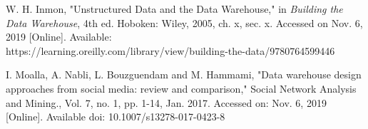 \documentclass[journal]{IEEEtran}
\begin{document}
\ifCLASSOPTIONcaptionsoff
  \newpage
\fi

\begin{thebibliography}{1}

W. H. Inmon, "Unstructured Data and the Data Warehouse," in 
  \emph{Building the Data Warehouse},
  4th ed. Hoboken: Wiley, 2005, ch. x, sec. x.
  Accessed on Nov. 6, 2019 [Online]. 
  Available: \\ https://learning.oreilly.com/library/view/building-the-data/9780764599446

I. Moalla, A. Nabli, L. Bouzguendam and M. Hammami,
 "Data warehouse design approaches from social media: review and comparison,"
 Social Network Analysis and Mining., Vol. 7, no. 1, pp. 1-14, Jan. 2017.
 Accessed on: Nov. 6, 2019 [Online]. Available doi: 10.1007/s13278-017-0423-8

\end{thebibliography}


\end{document}
